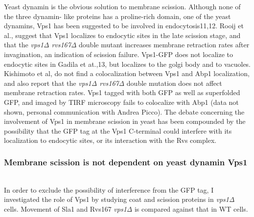 	Yeast dynamin is the obvious solution to membrane scission. Although none of the three dynamin- like proteins has a proline-rich domain, one of the yeast dynamins, Vps1 has been suggested to be involved in endocytosis11,12. Rooij et al., suggest that Vps1 localizes to endocytic sites in the late scission stage, and that the \textit{vps1Δ rvs167Δ} double mutant increases membrane retraction rates after invagination, an indication of scission failure. Vps1-GFP does not localize to endocytic sites in Gadila et at.,13, but localizes to the golgi body and to vacuoles. Kishimoto et al, do not find a colocalization between Vps1 and Abp1 localization, and also report that the \textit{vps1Δ rvs167Δ}  double mutation does not affect membrane retraction rates. Vps1 tagged with both GFP as well as superfolded GFP, and imaged by TIRF microscopy fails to colocalize with Abp1 (data not shown, personal communication with Andrea Picco). The debate concerning the involvement of Vps1 in membrane scission in yeast has been compounded by the possibility that the GFP tag at the Vps1 C-terminal could interfere with its localization to endocytic sites, or its interaction with the Rvs complex. 
	
		\subsubsection{Membrane scission is not dependent on yeast dynamin Vps1}
	\mbox{}\\
	In order to exclude the possibility of interference from the GFP tag, I investigated the role of Vps1 by studying coat and scission proteins in \textit{vps1Δ} cells. Movement of Sla1 and Rvs167 \textit{vps1Δ} is compared against that in WT cells. 
	
